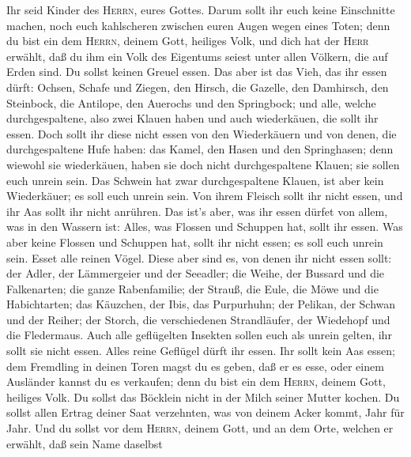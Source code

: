  Ihr seid Kinder des \textsc{Herrn}, eures Gottes. Darum
sollt ihr euch keine Einschnitte machen, noch euch kahlscheren zwischen
euren Augen wegen eines Toten;  denn du bist ein dem
\textsc{Herrn}, deinem Gott, heiliges Volk, und dich hat der
\textsc{Herr} erwählt, daß du ihm ein Volk des Eigentums seiest unter
allen Völkern, die auf Erden sind.  Du sollst keinen
Greuel essen.  Das aber ist das Vieh, das ihr essen dürft:
Ochsen, Schafe und Ziegen,  den Hirsch, die Gazelle, den
Damhirsch, den Steinbock, die Antilope, den Auerochs und den Springbock;
 und alle, welche durchgespaltene, also zwei Klauen haben
und auch wiederkäuen, die sollt ihr essen.  Doch sollt ihr
diese nicht essen von den Wiederkäuern und von denen, die
durchgespaltene Hufe haben: das Kamel, den Hasen und den Springhasen;
denn wiewohl sie wiederkäuen, haben sie doch nicht durchgespaltene
Klauen; sie sollen euch unrein sein.  Das Schwein hat zwar
durchgespaltene Klauen, ist aber kein Wiederkäuer; es soll euch unrein
sein. Von ihrem Fleisch sollt ihr nicht essen, und ihr Aas sollt ihr
nicht anrühren.  Das ist's aber, was ihr essen dürfet von
allem, was in den Wassern ist: Alles, was Flossen und Schuppen hat,
sollt ihr essen.  Was aber keine Flossen und Schuppen
hat, sollt ihr nicht essen; es soll euch unrein sein. 
Esset alle reinen Vögel.  Diese aber sind es, von denen
ihr nicht essen sollt: der Adler, der Lämmergeier und der Seeadler;
 die Weihe, der Bussard und die Falkenarten;
 die ganze Rabenfamilie;  der Strauß, die
Eule, die Möwe und die Habichtarten;  das Käuzchen, der
Ibis, das Purpurhuhn;  der Pelikan, der Schwan und der
Reiher;  der Storch, die verschiedenen Strandläufer, der
Wiedehopf und die Fledermaus.  Auch alle geflügelten
Insekten sollen euch als unrein gelten, ihr sollt sie nicht essen.
 Alles reine Geflügel dürft ihr essen. 
Ihr sollt kein Aas essen; dem Fremdling in deinen Toren magst du es
geben, daß er es esse, oder einem Ausländer kannst du es verkaufen; denn
du bist ein dem \textsc{Herrn}, deinem Gott, heiliges Volk. Du sollst
das Böcklein nicht in der Milch seiner Mutter kochen.  Du
sollst allen Ertrag deiner Saat verzehnten, was von deinem Acker kommt,
Jahr für Jahr.  Und du sollst vor dem \textsc{Herrn},
deinem Gott, und an dem Orte, welchen er erwählt, daß sein Name daselbst
